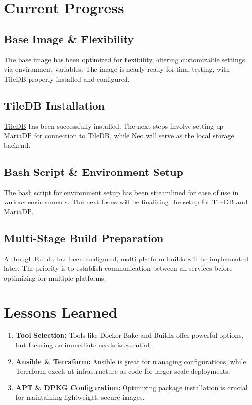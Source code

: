 \documentclass{article}
\begin{document}
\section{Current Progress}

\subsection{Base Image \& Flexibility}
The base image has been optimized for flexibility, offering customizable settings via environment variables. The image is nearly ready for final testing, with TileDB properly installed and configured.

\subsection{TileDB Installation}
\href{https://docs.tiledb.com/main/}{TileDB} has been successfully installed. The next steps involve setting up \href{https://mariadb.org/}{MariaDB} for connection to TileDB, while \href{https://neo4j.com/}{Neo} will serve as the local storage backend.

\subsection{Bash Script \& Environment Setup}
The bash script for environment setup has been streamlined for ease of use in various environments. The next focus will be finalizing the setup for TileDB and MariaDB.

\subsection{Multi-Stage Build Preparation}
Although \href{https://docs.docker.com/buildx/working-with-buildx/}{Buildx} has been configured, multi-platform builds will be implemented later. The priority is to establish communication between all services before optimizing for multiple platforms.

\section{Lessons Learned}
\begin{enumerate}
    \item \textbf{Tool Selection:} Tools like Docker Bake and Buildx offer powerful options, but focusing on immediate needs is essential.
    \item \textbf{Ansible \& Terraform:} Ansible is great for managing configurations, while Terraform excels at infrastructure-as-code for larger-scale deployments.
    \item \textbf{APT \& DPKG Configuration:} Optimizing package installation is crucial for maintaining lightweight, secure images.
\end{enumerate}
\end{document}
